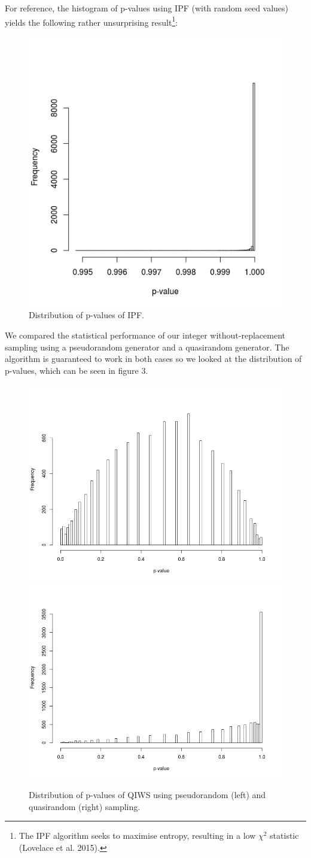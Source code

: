 \documentclass{JASSS}
\begin{document}
For reference, the histogram of p-values using IPF (with random seed
values) yields the following rather unsurprising result\footnote{The IPF algorithm
 seeks to maximise entropy, resulting in a low \(\chi^2\) statistic (Lovelace et al. 2015).}:


\begin{figure}[!t]
\centering
\includegraphics[width=0.5\linewidth]{figures/ipf_pvalue_dist}
\caption{Distribution of p-values of IPF.}
\label{fig:hist_ifp}
\end{figure}


We compared the statistical performance of our integer without-replacement sampling using a pseudorandom
generator and a quasirandom generator. The algorithm is guaranteed to
work in both cases so we looked at the distribution of p-values, which
can be seen in figure 3.

\begin{figure}[!t]
\centering
\includegraphics[width=0.498\linewidth]{figures/iqws_prng_pvalue_dist} 
\includegraphics[width=0.498\linewidth]{figures/iqws_pvalue_dist} 
\caption{Distribution of p-values of QIWS using pseudorandom (left) and quasirandom (right) sampling.}
\label{fig:hist_sampling}
\end{figure}
\end{document}
